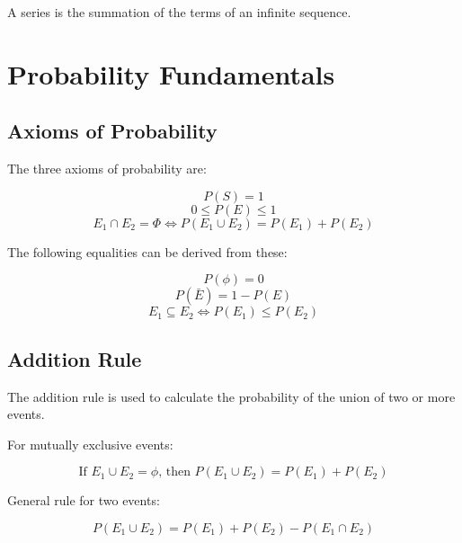 \documentclass[12pt]{article}
\begin{document}
	A series is the summation of the terms of an infinite sequence.
	
	
	\newpage
	\section{Probability Fundamentals}
	\subsection{Axioms of Probability}
	
	\noindent The three axioms of probability are:

	\begin{equation*}
		P(S)=1
	\end{equation*}
	\begin{equation*}
		0\leq P(E)\leq 1
	\end{equation*}
	\begin{equation*}
		E_{1}\cap E_{2} = \Phi \Leftrightarrow P(E_{1}\cup E_{2}) = P(E_{1}) + P(E_{2})
	\end{equation*}
	
	\noindent The following equalities can be derived from these:

	\begin{equation*}
		P(\phi)=0
	\end{equation*}
	\begin{equation*}
	P(\bar{E})=1-P(E)
	\end{equation*}
	\begin{equation*}
		E_{1}\subseteq E_{2}\Leftrightarrow P(E_{1})\leq P(E_{2})
	\end{equation*}
	
	\subsection{Addition Rule}
	
	The addition rule is used to calculate the probability of the union of two or more events.
	
	\noindent For mutually exclusive events:

	\begin{equation*}
		\text{If }E_{1}\cup E_{2} = \phi \text{, then }P(E_{1}\cup E_{2})=P(E_{1})+P(E_{2})
	\end{equation*}
	
	\noindent General rule for two events:

	\begin{equation*}
		P(E_{1}\cup E_{2}) = P(E_{1}) + P(E_{2}) - P(E_{1}\cap E_{2})
	\end{equation*}
	
\end{document}
